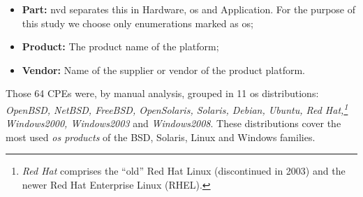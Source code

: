 \begin{itemize}
\item \textbf{Part:} \gls{nvd} separates this in Hardware, \gls{os} and Application. For the purpose of this study we choose only enumerations marked as \gls{os};
\item \textbf{Product:} The product name of the platform;
\item \textbf{Vendor:} Name of the supplier or vendor of the product platform.
\end{itemize}

Those 64 CPEs were, by manual analysis, grouped in 11 \gls{os} distributions: \textit{OpenBSD, NetBSD, FreeBSD, OpenSolaris, Solaris, Debian, Ubuntu, Red Hat,\footnote{\textit{Red Hat} comprises the ``old'' Red Hat Linux (discontinued in 2003) and the newer Red Hat Enterprise Linux (RHEL).} Windows2000, Windows2003} and \textit{Windows2008}.
These distributions cover the most used \emph{\gls{os} products} of the BSD, Solaris, Linux and Windows families.







